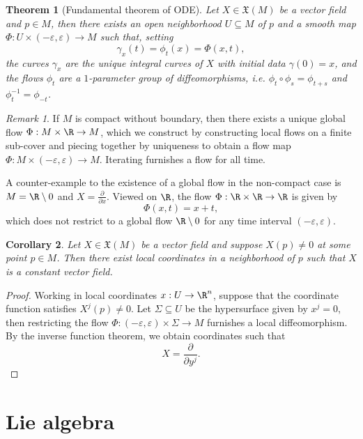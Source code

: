 \documentclass[reqno]{amsart}
\newtheorem{theorem}{Theorem}
\newtheorem{corollary}[theorem]{Corollary}
\theoremstyle{definition}
\theoremstyle{remark}
\newtheorem*{remark}{Remark}
\renewcommand{\epsilon}{\varepsilon}
\begin{document}
\begin{theorem}[Fundamental theorem of ODE]
	Let $X \in \mathfrak X (M)$ be a vector field and $p \in M$, then there exists an open neighborhood $U \subseteq M$ of $p$ and a smooth map $\Phi : U \times (-\epsilon, \epsilon) \to M$ such that, setting
		\[ \gamma_x (t) = \phi_t (x) = \Phi(x, t), \]
	the curves $\gamma_x$ are the unique integral curves of $X$ with initial data $\gamma(0) = x$, and the flows $\phi_t$ are a $1$-parameter group of diffeomorphisms, i.e. $\phi_t \circ \phi_s = \phi_{t + s}$ and $\phi_t^{-1} = \phi_{-t}$. 
\end{theorem}

\begin{remark}
	If $M$ is compact without boundary, then there exists a unique global flow $\Phi : M \times \R \to M$, which we construct by constructing local flows on a finite sub-cover and piecing together by uniqueness to obtain a flow map $\Phi : M \times (-\epsilon, \epsilon) \to M$. Iterating furnishes a flow for all time. 
	
	A counter-example to the existence of a global flow in the non-compact case is $M = \R \setminus 0$ and $X = \tfrac{\partial}{\partial x}$. Viewed on $\R$, the flow $\Phi : \R \times \R \to \R$ is given by 
		\[ \Phi(x, t) = x + t, \]
	which does not restrict to a global flow $\R \setminus 0$ for any time interval $(-\epsilon, \epsilon)$. 	
\end{remark}

\begin{corollary}
	Let $X \in \mathfrak X(M)$ be a vector field and suppose $X(p) \neq 0$ at some point $p \in M$. Then there exist local coordinates in a neighborhood of $p$ such that $X$ is a constant vector field.
\end{corollary}
	
\begin{proof}
	Working in local coordinates $x: U \to \R^n$, suppose that the coordinate function satisfies $X^j (p) \neq 0$. Let $\Sigma \subseteq U$ be the hypersurface given by $x^j = 0$, then restricting the flow $\Phi : (-\epsilon, \epsilon) \times \Sigma \to M$ furnishes a local diffeomorphism. By the inverse function theorem, we obtain coordinates such that 
		\[ X = \frac{\partial}{\partial y^j}. \]	
\end{proof}

\section{Lie algebra}
\end{document}
